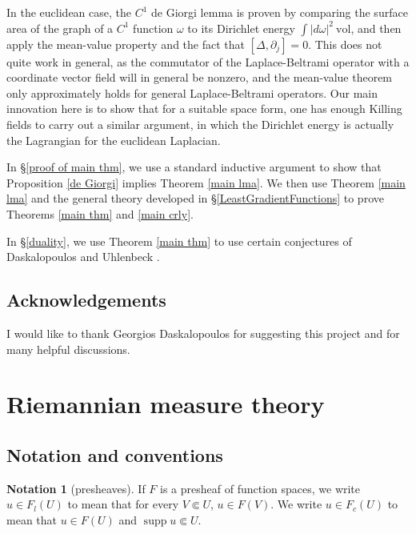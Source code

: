 \documentclass[reqno,12pt,letterpaper]{amsart}
\DeclareMathOperator{\supp}{supp}
\newcommand{\vol}{\mathrm{vol}}
\theoremstyle{definition}
\newtheorem{notation}[theorem]{Notation}
\numberwithin{equation}{section}
\begin{document}
In the euclidean case, the $C^1$ de Giorgi lemma is proven by comparing the surface area of the graph of a $C^1$ function $\omega$ to its Dirichlet energy $\int |d\omega|^2~\vol$, and then apply the mean-value property and the fact that $[\Delta, \partial_j] = 0$.
This does not quite work in general, as the commutator of the Laplace-Beltrami operator with a coordinate vector field will in general be nonzero, and the mean-value theorem only approximately holds for general Laplace-Beltrami operators.
Our main innovation here is to show that for a suitable space form, one has enough Killing fields to carry out a similar argument, in which the Dirichlet energy is actually the Lagrangian for the euclidean Laplacian.

In \S\ref{proof of main thm}, we use a standard inductive argument to show that Proposition \ref{de Giorgi} implies Theorem \ref{main lma}.
We then use Theorem \ref{main lma} and the general theory developed in \S\ref{LeastGradientFunctions} to prove Theorems \ref{main thm} and \ref{main crly}.

In \S\ref{duality}, we use Theorem \ref{main thm} to use certain conjectures of Daskalopoulos and Uhlenbeck \cite{daskalopoulos2020transverse}.


\subsection{Acknowledgements}
I would like to thank Georgios Daskalopoulos for suggesting this project and for many helpful discussions.


\section{Riemannian measure theory}\label{RiemMeasureThy}
\subsection{Notation and conventions}
\begin{notation}[presheaves]
If $F$ is a presheaf of function spaces, we write $u \in F_l(U)$ to mean that for every $V \Subset U$, $u \in F(V)$.
We write $u \in F_c(U)$ to mean that $u \in F(U)$ and $\supp u \Subset U$.
\end{notation}
\end{document}
